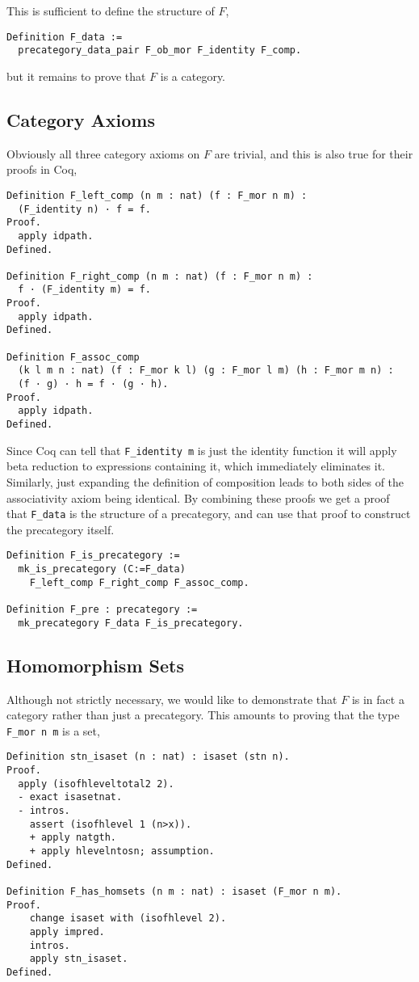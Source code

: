 This is sufficient to define the structure of $F$,
\begin{lstlisting}
Definition F_data := 
  precategory_data_pair F_ob_mor F_identity F_comp.
\end{lstlisting}
but it remains to prove that $F$ is a category.

\subsection{Category Axioms}
Obviously all three category axioms on $F$ are trivial, and this is also true
for their proofs in Coq,
\begin{lstlisting}
Definition F_left_comp (n m : nat) (f : F_mor n m) : 
  (F_identity n) · f = f.
Proof.
  apply idpath.
Defined.

Definition F_right_comp (n m : nat) (f : F_mor n m) : 
  f · (F_identity m) = f.
Proof.
  apply idpath.
Defined.

Definition F_assoc_comp 
  (k l m n : nat) (f : F_mor k l) (g : F_mor l m) (h : F_mor m n) :
  (f · g) · h = f · (g · h).
Proof.
  apply idpath.
Defined.
\end{lstlisting}

Since Coq can tell that \lstinline|F_identity m| is just the identity function it
will apply beta reduction to expressions containing it, which immediately
eliminates it. Similarly, just expanding the definition of composition leads to
both sides of the associativity axiom being identical. By combining these proofs
we get a proof that \lstinline|F_data| is the structure of a precategory, and can
use that proof to construct the precategory itself.

\begin{lstlisting}
Definition F_is_precategory := 
  mk_is_precategory (C:=F_data) 
    F_left_comp F_right_comp F_assoc_comp.

Definition F_pre : precategory := 
  mk_precategory F_data F_is_precategory.
\end{lstlisting}

\subsection{Homomorphism Sets}
Although not strictly necessary, we would like to demonstrate that $F$ is in
fact a category rather than just a precategory. This amounts to proving that the
type \lstinline|F_mor n m| is a set,

\begin{lstlisting}
Definition stn_isaset (n : nat) : isaset (stn n).
Proof.
  apply (isofhleveltotal2 2).
  - exact isasetnat.
  - intros.
    assert (isofhlevel 1 (n>x)).
    + apply natgth.
    + apply hlevelntosn; assumption.
Defined.

Definition F_has_homsets (n m : nat) : isaset (F_mor n m).
Proof.
    change isaset with (isofhlevel 2).
    apply impred.
    intros.
    apply stn_isaset.
Defined.
\end{lstlisting}

